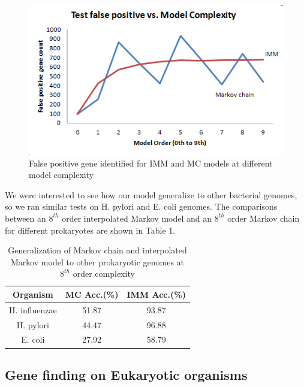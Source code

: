 \documentclass[11pt,letterpaper]{article}
\begin{document}
\begin{figure}
	\begin{center}
		\includegraphics[scale=0.8]{plots/false_positives_vs_model_complexity.png}
	\end{center}
	\caption{\label{font-table} False positive gene identified for IMM and MC models at different model complexity}
\end{figure}

We were interested to see how our model generalize to other bacterial genomes, so we ran similar tests on H. pylori and E. coli genomes. The comparisons between an $8^{th}$ order interpolated Markov model and an $8^{th}$ order Markov chain for different prokaryotes are shown in Table 1.

\begin{table}
	\begin{center}
		\begin{tabular}{|c|c|c|}
			\hline \bf Organism & \bf MC Acc.(\%) & \bf IMM Acc.(\%) \\ \hline
			H. influenzae & 51.87 & 93.87 \\
			\hline
			H. pylori & 44.47 & 96.88 \\
			\hline
			E. coli & 27.92 & 58.79 \\
			\hline
		\end{tabular}
	\end{center}
	\caption{\label{font-table} Generalization of Markov chain and interpolated Markov model to other prokaryotic genomes at $8^{th}$ order complexity}
\end{table}


\subsection{Gene finding on Eukaryotic organisms}
\end{document}
